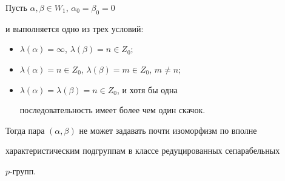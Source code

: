 \begin{thms}


Пусть $\alpha,\beta\in W_1$, $\alpha_0=\beta_0=0$


и выполняется одно из трех условий\/$:$


\begin{itemize}


\item[1)] $\lambda(\alpha)=\infty$, $\lambda(\beta)=n\in Z_0;$


\item[2)] $\lambda(\alpha)=n\in Z_0$, $\lambda(\beta)=m\in Z_0$, $m\neq n;$


\item[3)] $\lambda(\alpha)=\lambda(\beta)=n\in Z_0$, и хотя бы одна


последовательность имеет более чем один скачок.


\end{itemize}


Тогда пара $(\alpha,\beta)$ не может задавать почти изоморфизм по вполне


характеристическим подгруппам в классе редуцированных сепарабельных


$p$-групп.


\end{thms}





